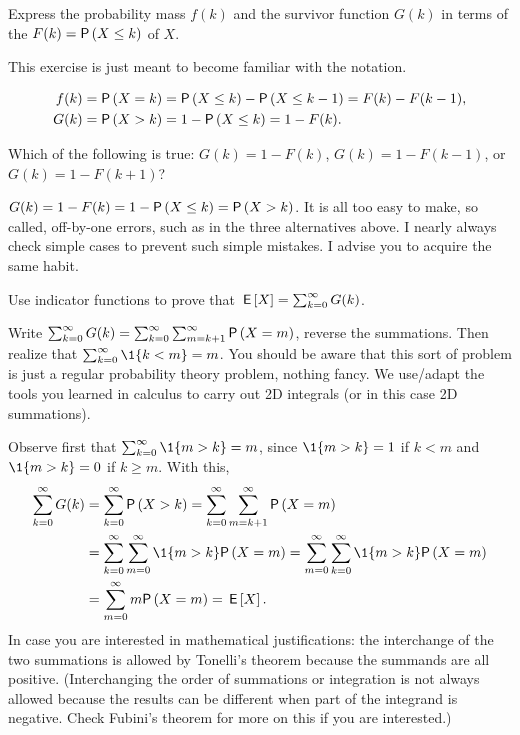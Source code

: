 \begin{exercise}\label{ex:5}
  Express the probability mass  $f(k)$ and the survivor function $G(k)$ in terms of the  $F(k)=\P{X\leq k}$ of $X$.
  \begin{hint}
This exercise is just meant to become familiar with the notation.
  \end{hint}
  \begin{solution}
    \begin{align*}
    f(k) &= \P{X=k} = \P{X\leq k} - \P{X\leq k-1} = F(k)-F(k-1), \\
    G(k) &= \P{X>k} = 1 - \P{X\leq k} = 1-F(k).        
    \end{align*}
  \end{solution}
\end{exercise}

\begin{extra}%
  Which of the following is true: $G(k) = 1-F(k)$, $G(k) = 1-F(k-1)$, or $G(k) = 1-F(k+1)$?
  \begin{solution}
  $G(k) = 1- F(k) = 1-\P{X\leq k} = \P{X>k}$. 
    It is all too easy to make, so called, off-by-one errors, such as
    in the three alternatives above.  I nearly always check simple
    cases to prevent such simple mistakes. I advise you to acquire the
    same habit.
  \end{solution}
\end{extra}


\begin{exercise}\label{ex:6}
 Use indicator functions to prove that $\,\mathsf{E}\left[X\right] =  \sum_{k=0}^\infty G(k)$.
    \begin{hint}
Write 
$\sum_{k=0}^\infty G(k) = \sum_{k=0}^\infty \sum_{m=k+1}^\infty \P{X=m}$, reverse the summations. Then realize that $\sum_{k=0}^\infty \1{k<m} = m$. 
You should be aware that this sort of problem is just a regular probability
  theory problem, nothing fancy. We use/adapt the tools you learned in
  calculus to carry out 2D integrals (or in this case 2D summations).
    \end{hint}
\begin{solution}
Observe first that $\sum_{k=0}^\infty \1{m>k} = m$, since $\1{m>k}=1$ if $k<m$ and $\1{m>k} = 0$ if $k\geq m$. With this, 
\begin{align*}
\sum_{k=0}^\infty G(k) 
&= \sum_{k=0}^\infty \P{X>k} 
= \sum_{k=0}^\infty \sum_{m=k+1}^\infty \P{X=m}  \\
& = \sum_{k=0}^\infty \sum_{m=0}^\infty \1{m>k} \P{X=m} 
= \sum_{m=0}^\infty \sum_{k=0}^\infty \1{m>k} \P{X=m} \\
&= \sum_{m=0}^\infty m\P{X=m} = \E X.
\end{align*}
In case you are interested in mathematical justifications: the interchange of the two summations is allowed by Tonelli's theorem because the summands are all positive.
(Interchanging the order of summations or integration is not always allowed because the results can be different when part of the integrand is negative.
Check Fubini's theorem for more on this if you are interested.)
\end{solution}
\end{exercise}

